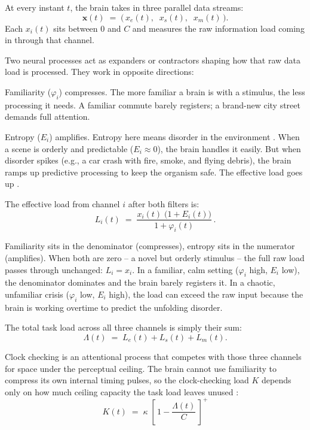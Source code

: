 \documentclass[11pt,a4paper]{article}
\begin{document}
At every instant $t$, the brain takes in three parallel data streams:
\[
\mathbf{x}(t) \;=\; \bigl(\, x_e(t),\;\; x_s(t),\;\; x_m(t) \,\bigr).
\]
Each $x_i(t)$ sits between $0$ and $C$ and measures the raw information load coming in through that channel.

Two neural processes act as expanders or contractors shaping how that raw data load is processed. They work in opposite directions:

Familiarity ($\varphi_i$) compresses. The more familiar a brain is with a stimulus, the less processing it needs. A familiar commute barely registers; a brand-new city street demands full attention.

Entropy ($E_i$) amplifies. Entropy here means disorder in the environment \citep{Hechler2023energy}. When a scene is orderly and predictable ($E_i \approx 0$), the brain handles it easily. But when disorder spikes (e.g., a car crash with fire, smoke, and flying debris), the brain ramps up predictive processing to keep the organism safe. The effective load goes up \citep{Tang2025less}.

The effective load from channel $i$ after both filters is:
\begin{equation}
	L_i(t) \;=\; \frac{x_i(t)\;\bigl(1 + E_i(t)\bigr)}{1 + \varphi_i(t)}\,.
\end{equation}

Familiarity sits in the denominator (compresses), entropy sits in the numerator (amplifies). When both are zero -- a novel but orderly stimulus -- the full raw load passes through unchanged: $L_i = x_i$. In a familiar, calm setting ($\varphi_i$ high, $E_i$ low), the denominator dominates and the brain barely registers it. In a chaotic, unfamiliar crisis ($\varphi_i$ low, $E_i$ high), the load can exceed the raw input because the brain is working overtime to predict the unfolding disorder.

The total task load across all three channels is simply their sum:
\begin{equation}
	\Lambda(t) \;=\; L_e(t) + L_s(t) + L_m(t).
\end{equation}

Clock checking is an attentional process that competes with those three channels for space under the perceptual ceiling. The brain cannot use familiarity to compress its own internal timing pulses, so the clock-checking load $K$ depends only on how much ceiling capacity the task load leaves unused \citep{zakay1996attention}:
\begin{equation}
	K(t) \;=\; \kappa\;\left[\,1 - \frac{\Lambda(t)}{C}\,\right]^{+}
\end{equation}
\end{document}
